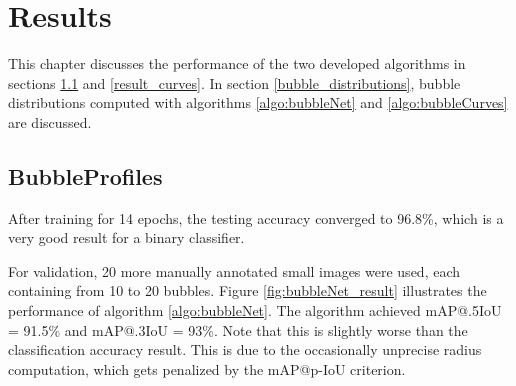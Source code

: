 \chapter{Results}\label{results}
	This chapter discusses the performance of the two developed algorithms in sections \ref{result_profiles} and \ref{result_curves}. In section \ref{bubble_distributions}, bubble distributions computed with algorithms \ref{algo:bubbleNet} and \ref{algo:bubbleCurves} are discussed. 
	
		\section{BubbleProfiles}\label{result_profiles}
			
			After training for 14 epochs, the testing accuracy converged to 96.8\%, which is a very good result for a binary classifier. 

			For validation, 20 more manually annotated small images were used, each containing from 10 to 20 bubbles. Figure \ref{fig:bubbleNet_result} illustrates the performance of algorithm \ref{algo:bubbleNet}.  
			The algorithm achieved mAP@.5IoU = 91.5\% and mAP@.3IoU = 93\%. Note that this is slightly worse than the classification accuracy result. This is due to the occasionally unprecise radius computation, which gets penalized by the mAP@p-IoU criterion. 
			
